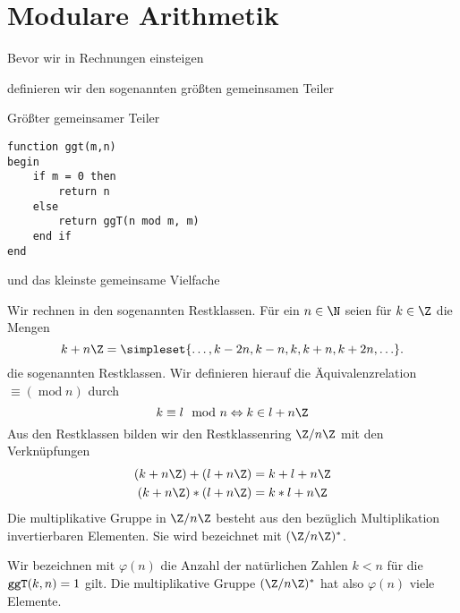 \chapter{Modulare Arithmetik}
Bevor wir in Rechnungen einsteigen

definieren wir den sogenannten größten gemeinsamen Teiler


Größter gemeinsamer Teiler
\begin{lstlisting}
function ggt(m,n)
begin
	if m = 0 then 
		return n
	else 
		return ggT(n mod m, m)
	end if
end
\end{lstlisting}

und das kleinste gemeinsame Vielfache






Wir rechnen in den sogenannten Restklassen. Für ein $n\in\N$ seien für $k\in\Z$ die Mengen
\begin{equation*}
	k+n\Z=\simpleset{\ldots,k-2n,k-n,k,k+n,k+2n,\ldots}.
\end{equation*}
die sogenannten Restklassen. Wir definieren hierauf die Äquivalenzrelation $\equiv (\operatorname{mod} n)$ durch
\begin{equation*}
	k\equiv l\mod n\Leftrightarrow k\in l+n\Z
\end{equation*}
Aus den Restklassen bilden wir den Restklassenring $\Z/n\Z$ mit den Verknüpfungen
\begin{align*}
	(k+n\Z)+(l+n\Z)&=k+l+n\Z\\
	(k+n\Z)*(l+n\Z)&=k*l+n\Z\\
\end{align*}
Die multiplikative Gruppe in $\Z/n\Z$ besteht aus den bezüglich Multiplikation invertierbaren Elementen. Sie wird bezeichnet mit $(\Z/n\Z)^\ast$.

Wir bezeichnen mit $\varphi(n)$ die Anzahl der natürlichen Zahlen $k<n$ für die $\texttt{ggT}(k,n)=1$ gilt. Die multiplikative Gruppe $(\Z/n\Z)^\ast$ hat also $\varphi(n)$ viele Elemente.








